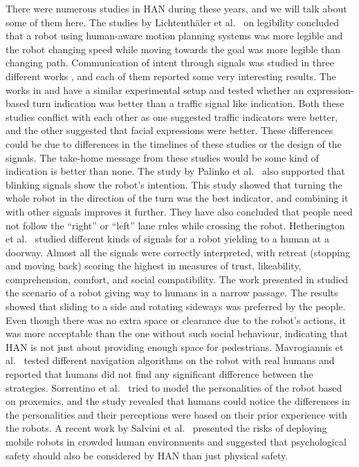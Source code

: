 There were numerous studies in HAN during these years, and we will talk about some of them here. The studies by Lichtenth{\"a}ler et al.~\cite{lichtenthaler2012increasing, lichtenthaler2013social} on legibility concluded that a robot using human-aware motion planning systems was more legible and the robot changing speed while moving towards the goal was more legible than changing path. Communication of intent through signals was studied in three different works \cite{may2015show, hart2020using, palinko2020intention}, and each of them reported some very interesting results. The works in \cite{may2015show} and \cite{hart2020using} have a similar experimental setup and tested whether an expression-based turn indication was better than a traffic signal like indication. Both these studies conflict with each other as one suggested traffic indicators were better, and the other suggested that facial expressions were better. These differences could be due to differences in the timelines of these studies or the design of the signals. The take-home message from these studies would be some kind of indication is better than none. The study by Palinko et al.~\cite{palinko2020intention} also supported that blinking signals show the robot’s intention. This study showed that turning the whole robot in the direction of the turn was the best indicator, and combining it with other signals improves it further. They have also concluded that people need not follow the “right” or “left” lane rules while crossing the robot. Hetherington et al.~\cite{hetherington2021mobile} studied different kinds of signals for a robot yielding to a human at a doorway. Almost all the signals were correctly interpreted, with retreat (stopping and moving back) scoring the highest in measures of trust, likeability, comprehension, comfort, and social compatibility. The work presented in \cite{senft2020would} studied the scenario of a robot giving way to humans in a narrow passage. The results showed that sliding to a side and rotating sideways was preferred by the people. Even though there was no extra space or clearance due to the robot’s actions, it was more acceptable than the one without such social behaviour, indicating that HAN is not just about providing enough space for pedestrians. Mavrogiannis et al.~\cite{mavrogiannis2019effects} tested different navigation algorithms on the robot with real humans and reported that humans did not find any significant difference between the strategies. Sorrentino et al.~\cite{sorrentino2021modeling} tried to model the personalities of the robot based on proxemics, and the study revealed that humans could notice the differences in the personalities and their perceptions were based on their prior experience with the robots. A recent work by Salvini et al.~\cite{salvini2022safety} presented the risks of deploying mobile robots in crowded human environments and suggested that psychological safety should also be considered by HAN than just physical safety.

